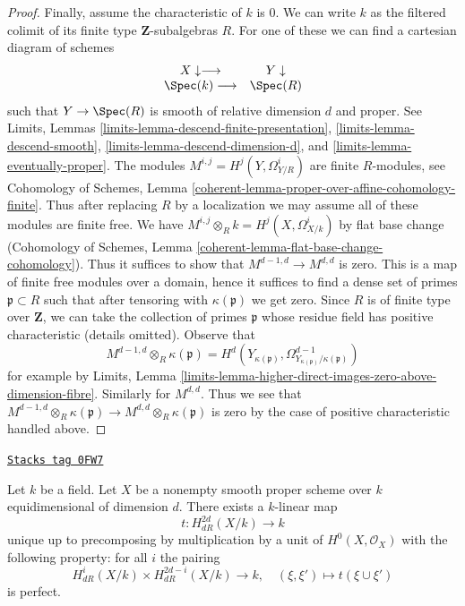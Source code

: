 \begin{proof}
\medskip\noindent
Finally, assume the characteristic of $k$ is $0$.
We can write $k$ as the filtered colimit of its finite type
$\mathbf{Z}$-subalgebras $R$. For one of these we can find a
cartesian diagram of schemes
$$
\begin{array}{cc}X \downarrow\longrightarrow & Y \downarrow \\ \Spec(k) \longrightarrow & \Spec(R)\end{array}
$$
such that $Y \to \Spec(R)$ is smooth of relative dimension $d$ and proper.
See Limits, Lemmas \ref{limits-lemma-descend-finite-presentation},
\ref{limits-lemma-descend-smooth}, \ref{limits-lemma-descend-dimension-d}, and
\ref{limits-lemma-eventually-proper}.
The modules $M^{i, j} = H^j(Y, \Omega^i_{Y/R})$ are finite $R$-modules, see
Cohomology of Schemes, Lemma
\ref{coherent-lemma-proper-over-affine-cohomology-finite}.
Thus after replacing $R$ by a localization we may assume all of these
modules are finite free. We have
$M^{i, j} \otimes_R k = H^j(X, \Omega^i_{X/k})$
by flat base change (Cohomology of Schemes, Lemma
\ref{coherent-lemma-flat-base-change-cohomology}).
Thus it suffices to show that $M^{d - 1, d} \to M^{d, d}$
is zero. This is a map of finite free modules over a domain,
hence it suffices to find a dense set of primes $\mathfrak p \subset R$
such that after tensoring with $\kappa(\mathfrak p)$ we get zero.
Since $R$ is of finite type over $\mathbf{Z}$, we can take
the collection of primes $\mathfrak p$ whose residue field
has positive characteristic (details omitted). Observe that
$$
M^{d - 1, d} \otimes_R \kappa(\mathfrak p) =
H^d(Y_{\kappa(\mathfrak p)},
\Omega^{d - 1}_{Y_{\kappa(\mathfrak p)}/\kappa(\mathfrak p)})
$$
for example by Limits, Lemma
\ref{limits-lemma-higher-direct-images-zero-above-dimension-fibre}.
Similarly for $M^{d, d}$. Thus we see that
$M^{d - 1, d} \otimes_R \kappa(\mathfrak p) \to
M^{d, d} \otimes_R \kappa(\mathfrak p)$
is zero by the case of positive characteristic handled above.
\end{proof}

\begin{proposition}
\label{derham-proposition-poincare-duality}
\href{https://stacks.math.columbia.edu/tag/0FW7}{\texttt{Stacks tag 0FW7}}

Let $k$ be a field. Let $X$ be a nonempty smooth proper scheme over $k$
equidimensional of dimension $d$. There exists a $k$-linear map
$$
t : H^{2d}_{dR}(X/k) \longrightarrow k
$$
unique up to precomposing by multiplication by a unit of
$H^0(X, \mathcal{O}_X)$ with the following property: for all $i$ the pairing
$$
H^i_{dR}(X/k) \times H_{dR}^{2d - i}(X/k)
\longrightarrow
k, \quad
(\xi, \xi') \longmapsto t(\xi \cup \xi')
$$
is perfect.
\end{proposition}

